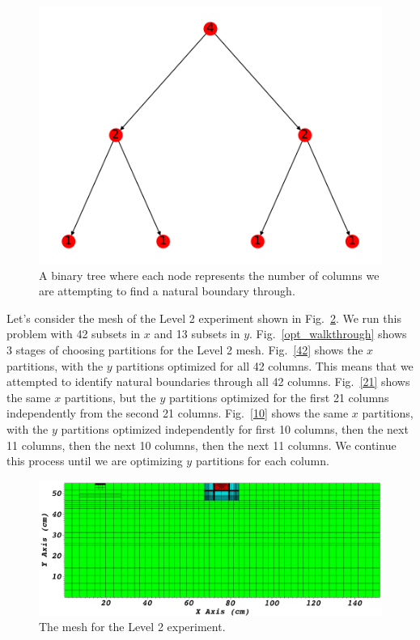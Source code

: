 \begin{figure}[h]
\centering
\includegraphics[scale=0.75]{../figures/binary_tree.pdf}
\caption{A binary tree where each node represents the number of columns we are attempting to find a natural boundary through.}
\label{binary_tree}
\end{figure}

Let's consider the mesh of the Level 2 experiment shown in Fig.~\ref{level2_nocut}.
We run this problem with 42 subsets in $x$ and 13 subsets in $y$.
Fig.~\ref{opt_walkthrough} shows 3 stages of choosing partitions for the Level 2 mesh.
Fig.~\ref{42} shows the $x$ partitions, with the $y$ partitions optimized for all 42 columns. 
This means that we attempted to identify natural boundaries through all 42 columns. 
Fig.~\ref{21} shows the same $x$ partitions, but the $y$ partitions optimized for the first 21 columns independently from the second 21 columns. 
Fig.~\ref{10} shows the same $x$ partitions, with the $y$ partitions optimized independently for first 10 columns, then the next 11 columns, then the next 10 columns, then the next 11 columns. 
We continue this process until we are optimizing $y$ partitions for each column.
\begin{figure}[h]
\centering
\includegraphics[scale=0.3]{../../figures/level2_nocut.png}
\caption{The mesh for the Level 2 experiment.}
\label{level2_nocut}
\end{figure}

